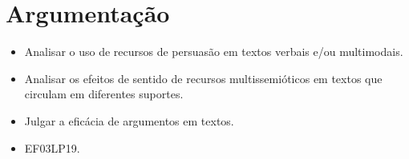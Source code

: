 \chapter{Argumentação}



\begin{itemize}
  \item Analisar o uso de recursos de persuasão em textos verbais e/ou
multimodais.
  \item Analisar os efeitos de sentido de recursos multissemióticos em
textos que circulam em diferentes suportes.
  \item Julgar a eficácia de argumentos em textos.
\end{itemize}


\begin{itemize}
  \item EF03LP19.
\end{itemize}

